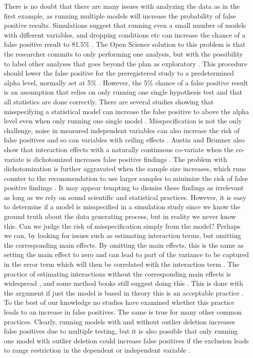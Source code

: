 There is no doubt that there are many issues with analyzing the data as in the first example, as running multiple models will increase the probability of false positive results. Simulations suggest that running even a small number of models with different variables, and dropping conditions  etc can increase the chance of a false positive result to 81.5\% \citep{Simmons2011}. The Open Science solution to this problem is that the researcher commits to only performing one analysis, but with the possibility to label other analyses that goes beyond the plan as exploratory \citep{Nosek2018}. This procedure should lower the false positive for the preregistered study to a predetermined alpha level, normally set at 5\% \citep{Moore2016}. However, the 5\% chance of a false positive result is an assumption that relies on only running one single hypothesis test and that all statistics are done correctly. There are several studies showing that misspecifying a  statistical model can increase the false positive to above the alpha level even when only running one single model \citep{Dennis2019,Litiere2007}. Misspecification is not the only challenge, noise in measured independent variables can also increase the risk of false positives \citep{Brunner2009} and so can variables with ceiling effects \citep{Austin2003}. Austin and Brunner also show that interaction effects with a naturally continuous co-variate when the co-variate is dichotomized increases false positive findings \citep{Austin2004}. The problem with dichotomization is further aggravated when the sample size increases, which runs counter to the recommendation to use larger samples to minimize the risk of false positive findings \citep{Simmons2011}. It may appear tempting to dismiss these findings as irrelevant as long as we rely on sound scientific and statistical practices. However, it is easy to determine if a model is misspecified in a simulation study since we know the ground truth about the data generating process, but in reality we never know this. Can we judge the risk of misspecification simply from the model? Perhaps we can, by looking for issues such as estimating interaction terms, but omitting the corresponding main effects. By omitting the main effects, this is the same as setting the main effect to zero and can lead to part of the variance to be captured in the error term which will then be correlated with the interaction term \citep{Branbor2006}. The practice of estimating interactions without the corresponding main effects is widespread \citep{Branbor2006}, and some method books still suggest doing this \citep{Cleves2008}. This is done with the argument if just the model is based in theory this is an acceptable practice \citep{aiken1991multiple}. To the best of our knowledge no studies have examined whether this practice leads to an increase in false positives. The same is true for many other common practices. Clearly, running models with and without outlier deletion increases false positives due to multiple testing, but it is also possible that only running one model with outlier deletion could increase false positives if the exclusion leads to range restriction in the dependent or independent variable \citep{Raju2003}. \\        

